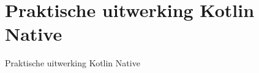 \chapter{Praktische uitwerking Kotlin Native}
\label{ch:praktisch}
Praktische uitwerking Kotlin Native


